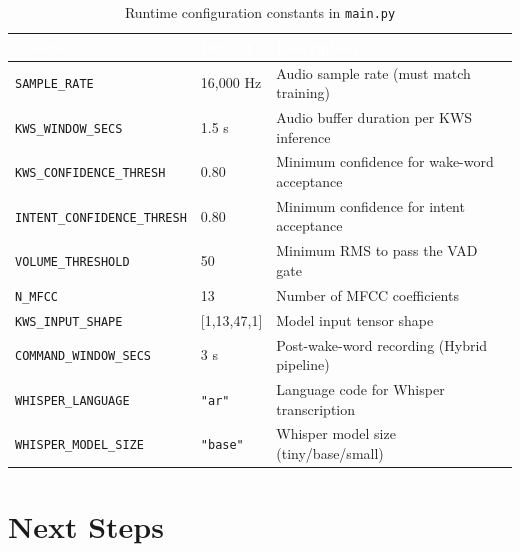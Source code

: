 \documentclass[12pt, a4paper]{report}
\newcommand{\thead}[1]{%
  \cellcolor{tableheader}\textcolor{white}{\textbf{#1}}}
\newcommand{\trow}[1]{\rowcolor{rowalt}#1}
\begin{document}
\begin{table}[h!]
\centering
\caption{Runtime configuration constants in \texttt{main.py}}
\label{tab:constants}
\begin{tabularx}{\textwidth}{llX}
\toprule
\thead{Constant} & \thead{Default} & \thead{Description} \\
\midrule
\trow{\texttt{SAMPLE\_RATE}}             & 16{,}000 Hz     & Audio sample rate (must match training) \\
\texttt{KWS\_WINDOW\_SECS}               & 1.5 s           & Audio buffer duration per KWS inference \\
\trow{\texttt{KWS\_CONFIDENCE\_THRESH}}  & 0.80            & Minimum confidence for wake-word acceptance \\
\texttt{INTENT\_CONFIDENCE\_THRESH}      & 0.80            & Minimum confidence for intent acceptance \\
\trow{\texttt{VOLUME\_THRESHOLD}}        & 50              & Minimum RMS to pass the VAD gate \\
\texttt{N\_MFCC}                         & 13              & Number of MFCC coefficients \\
\trow{\texttt{KWS\_INPUT\_SHAPE}}        & [1,13,47,1]     & Model input tensor shape \\
\texttt{COMMAND\_WINDOW\_SECS}           & 3 s             & Post-wake-word recording (Hybrid pipeline) \\
\trow{\texttt{WHISPER\_LANGUAGE}}        & \texttt{"ar"}   & Language code for Whisper transcription \\
\texttt{WHISPER\_MODEL\_SIZE}            & \texttt{"base"} & Whisper model size (tiny/base/small) \\
\bottomrule
\end{tabularx}
\end{table}

\chapter{Next Steps}
\end{document}
